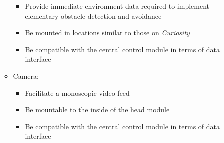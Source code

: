\begin{itemize}
\begin{itemize}
          \begin{itemize}
            \item Provide immediate environment data required to implement elementary obstacle detection and avoidance
            \item Be mounted in locations similar to those on \textit{Curiosity}
            \item Be compatible with the central control module in terms of data interface
          \end{itemize}
          \item Camera:
          \begin{itemize}
            \item Facilitate a monoscopic video feed
            \item Be mountable to the inside of the head module
            \item Be compatible with the central control module in terms of data interface
          \end{itemize}
      \end{itemize}
    \end{itemize}
      
